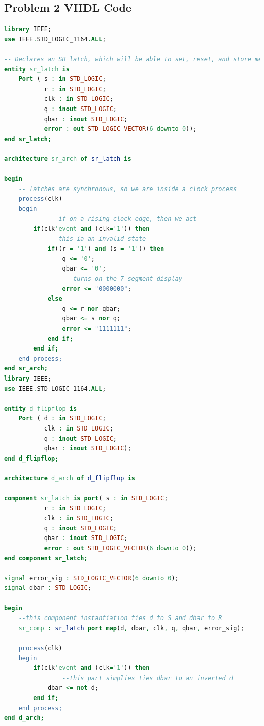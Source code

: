 \documentclass[11pt]{article}
\begin{document}
\begin{appendices}
\section{Problem 2 VHDL Code}
\begin{lstlisting}[language=VHDL]
library IEEE;
use IEEE.STD_LOGIC_1164.ALL;

-- Declares an SR latch, which will be able to set, reset, and store memory
entity sr_latch is
    Port ( s : in STD_LOGIC;
           r : in STD_LOGIC;
           clk : in STD_LOGIC;
           q : inout STD_LOGIC;
           qbar : inout STD_LOGIC;
           error : out STD_LOGIC_VECTOR(6 downto 0));
end sr_latch;

architecture sr_arch of sr_latch is

begin
	-- latches are synchronous, so we are inside a clock process
    process(clk)
    begin
    		-- if on a rising clock edge, then we act
        if(clk'event and (clk='1')) then
        	-- this ia an invalid state
            if((r = '1') and (s = '1')) then
                q <= '0';
                qbar <= '0';
                -- turns on the 7-segment display
                error <= "0000000";
            else
                q <= r nor qbar;
                qbar <= s nor q;
                error <= "1111111";
            end if;
        end if;
    end process;
end sr_arch;
library IEEE;
use IEEE.STD_LOGIC_1164.ALL;

entity d_flipflop is
    Port ( d : in STD_LOGIC;
           clk : in STD_LOGIC;
           q : inout STD_LOGIC;
           qbar : inout STD_LOGIC);
end d_flipflop;

architecture d_arch of d_flipflop is

component sr_latch is port( s : in STD_LOGIC;
           r : in STD_LOGIC;
           clk : in STD_LOGIC;
           q : inout STD_LOGIC;
           qbar : inout STD_LOGIC;
           error : out STD_LOGIC_VECTOR(6 downto 0));
end component sr_latch;

signal error_sig : STD_LOGIC_VECTOR(6 downto 0);
signal dbar : STD_LOGIC;

begin
	--this component instantiation ties d to S and dbar to R
    sr_comp : sr_latch port map(d, dbar, clk, q, qbar, error_sig);
    
    process(clk)
    begin
        if(clk'event and (clk='1')) then
        		--this part simplies ties dbar to an inverted d
            dbar <= not d;
        end if;
    end process;
end d_arch;
\end{lstlisting}


\end{appendices}
\end{document}
